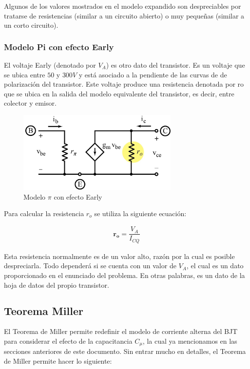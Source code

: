 Algunos de los valores mostrados en el modelo expandido son despreciables por tratarse de resistencias (similar a un circuito abierto) o muy pequeñas (similar a un corto circuito).

\subsubsection{Modelo Pi con efecto Early}

El voltaje Early (denotado por $V_A$) es otro dato del transistor. Es un voltaje que se ubica entre $50$ y $300 V$ y está asociado a la pendiente de las curvas de de polarización del transistor. Este voltaje produce una resistencia denotada por ro que se ubica en la salida del modelo equivalente del transistor, es decir, entre colector y emisor.

\begin{figure}[H]
    \centering
    \includegraphics[width=8cm]{Imagenes/modelo_pi3.jpg}
    \caption{Modelo $\pi$ con efecto Early}
    \label{fig:modelo_pi3}
\end{figure}

Para calcular la resistencia $r_o$ se utiliza la siguiente ecuación:

\begin{gather}
    \mathbf{r_o} = \dfrac{V_{A}}{I_{CQ}} \label{eqn:ro}
\end{gather}

Esta resistencia normalmente es de un valor alto, razón por la cual es posible despreciarla. Todo dependerá si se cuenta con un valor de $V_A$, el cual es un dato proporcionado en el enunciado del problema. En otras palabras, es un dato de la hoja de datos del propio transistor.

\subsection{Teorema Miller}

El Teorema de Miller permite redefinir el modelo de corriente alterna del BJT para considerar el efecto de la capacitancia $C_{\mu}$, la cual ya mencionamos en las secciones anteriores de este documento. Sin entrar mucho en detalles, el Teorema de Miller permite hacer lo siguiente:



